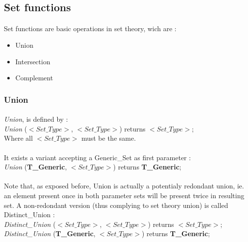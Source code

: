 \subsection {Set functions}

\paragraph{}
Set functions are basic operations in set theory, wich are :
\begin {itemize}
\item Union
\item Intersection
\item Complement
\end {itemize}  

\subsubsection {Union}

\paragraph{}
\textit{Union}, is defined by :\\ 
\textit{Union} ($<Set\_Type>$, $<Set\_Type>$) returns $<Set\_Type>$;\\
Where all $<Set\_Type>$ must be the same.

\paragraph{}
It exists a variant accepting a Generic\_Set as first parameter :\\
\textit{Union} (\textbf{T\_Generic}, $<Set\_Type>$) returns \textbf{T\_Generic};\\

\paragraph{}
Note that, as exposed before, Union is actually a potentialy 
redondant union, ie. an element present once in both parameter 
sets will be present twice in resulting set. A non-redondant version
(thus complying to set theory union) is called Distinct\_Union :\\
\textit{Distinct\_Union} ($<Set\_Type>$, $<Set\_Type>$) returns $<Set\_Type>$;\\
\textit{Distinct\_Union} (\textbf{T\_Generic}, $<Set\_Type>$) returns \textbf{T\_Generic};

